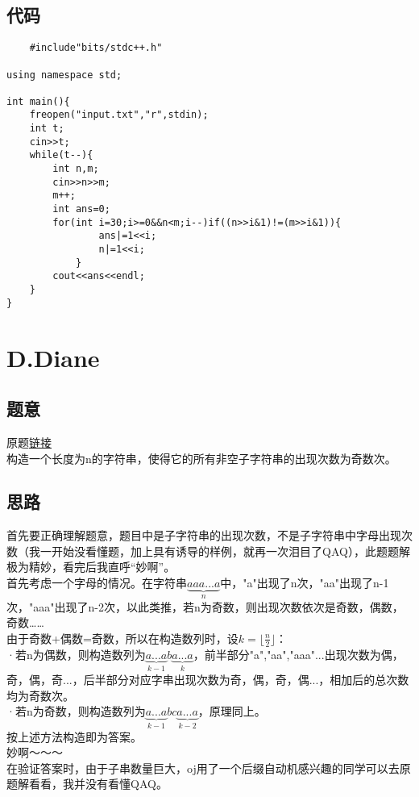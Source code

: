 \documentclass[cyan,pad,cn]{elegantnote}
\begin{document}
\subsection{代码}
\begin{lstlisting}
    #include"bits/stdc++.h"

using namespace std;

int main(){
    freopen("input.txt","r",stdin);
    int t;
    cin>>t;
    while(t--){
        int n,m;
        cin>>n>>m;
        m++;
        int ans=0;
        for(int i=30;i>=0&&n<m;i--)if((n>>i&1)!=(m>>i&1)){
                ans|=1<<i;
                n|=1<<i;
            }
        cout<<ans<<endl;
    }
}
\end{lstlisting}

\section{
    D.Diane
}

\subsection{题意}
\begin{paragraph}
    原题\href{http://codeforces.com/contest/1554/problem/D}{链接}\\
    构造一个长度为n的字符串，使得它的所有非空子字符串的出现次数为奇数次。
\end{paragraph}

\subsection{思路}

\begin{paragraph}
    首先要正确理解题意，题目中是子字符串的出现次数，不是子字符串中字母出现次数（我一开始没看懂题，加上具有诱导的样例，就再一次泪目了QAQ），此题题解极为精妙，看完后我直呼“妙啊”。\\
    首先考虑一个字母的情况。在字符串\(\underbrace{aaa...a}_{n} \)中，"a"出现了n次，"aa"出现了n-1次，"aaa"出现了n-2次，以此类推，若n为奇数，则出现次数依次是奇数，偶数，奇数……\\
    由于奇数+偶数=奇数，所以在构造数列时，设\(k=\lfloor \frac{n}{2} \rfloor \)：\\
    ·若n为偶数，则构造数列为\(\underbrace{a...a}_{k-1} b\underbrace{a...a}_{k}\)，前半部分"a","aa","aaa"...出现次数为偶，奇，偶，奇...，后半部分对应字串出现次数为奇，偶，奇，偶...，相加后的总次数均为奇数次。\\
    ·若n为奇数，则构造数列为\(\underbrace{a...a}_{k-1} bc\underbrace{a...a}_{k-2}\)，原理同上。\\
    按上述方法构造即为答案。\\
    妙啊～～～\\
    在验证答案时，由于子串数量巨大，oj用了一个后缀自动机感兴趣的同学可以去原题解看看，我并没有看懂QAQ。
\end{paragraph}
\end{document}
